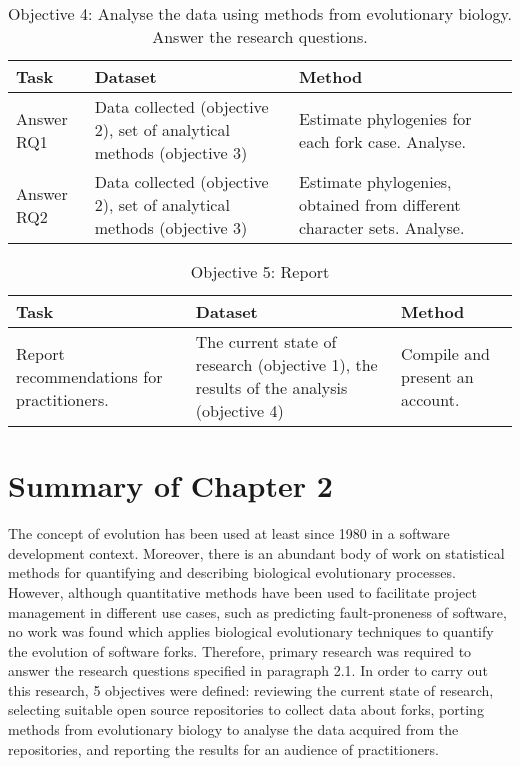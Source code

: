\begin{table}[H]
\caption*{Objective 4: Analyse the data using methods from evolutionary biology. Answer the research questions.}
\label{table:objective4}
\centering
\begin{tabu} to 
\toprule
Task & Dataset & Method \\
\midrule
Answer RQ1 & Data collected (objective 2), set of analytical methods (objective 3) & Estimate phylogenies for each fork case. Analyse. \\
\midrule
Answer RQ2 & Data collected (objective 2), set of analytical methods (objective 3) & Estimate phylogenies, obtained from different character sets. Analyse. \\
\bottomrule
\end{tabu}
\end{table}

\begin{table}[H]
\caption*{Objective 5: Report}
\centering
\begin{tabu} to 
\toprule
Task & Dataset & Method \\
\midrule
Report recommendations for practitioners. & The current state of research (objective 1), the results of the analysis (objective 4) & Compile and present an account. \\
\bottomrule
\end{tabu}
\end{table}


\section{Summary of Chapter 2}
The concept of evolution has been used at least since 1980 in a software development context. Moreover, there is an abundant body of work on statistical methods for quantifying and describing biological evolutionary processes. However, although quantitative methods have been used to facilitate project management in different use cases, such as predicting fault-proneness of software, no work was found which applies biological evolutionary techniques to quantify the evolution of software forks. Therefore, primary research was required to answer the research questions specified in paragraph 2.1. In order to carry out this research, 5 objectives were defined: reviewing the current state of research, selecting suitable open source repositories to collect data about forks, porting methods from evolutionary biology to analyse the data acquired from the repositories, and reporting the results for an audience of practitioners.

